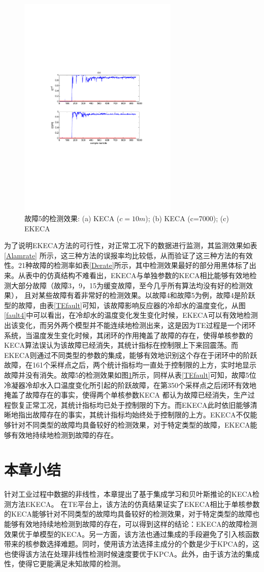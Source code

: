 \begin{figure}[!htb]
  \includegraphics[width=3in]{./Pictures/5-3.pdf}
  \caption{故障5的检测效果: (a) KECA ($c=10m$); (b) KECA (c=7000); (c) EKECA}\label{fault5}
  \vspace*{-0.4cm}
\end{figure}

为了说明EKECA方法的可行性，对正常工况下的数据进行监测，其监测效果如表\ref{Alamrate} 所示，这三种方法的误报率均比较低，从而验证了这三种方法的有效性。21种故障的检测率如表\ref{Derate}所示，其中检测效果最好的部分用黑体标了出来。从表中的仿真结构不难看出，EKECA与单独参数的KECA相比能够有效地检测大部分故障（故障3，9，15为缓变故障，至今几乎所有算法均没有好的检测效果）， 且对某些故障有着非常好的检测效果。以故障4和故障5为例，故障4是阶跃型的故障，由表\ref{TEfault}可知，该故障影响反应器的冷却水的温度变化，从图\ref{fault4}中可以看出，在冷却水的温度变化发生变化时候，EKECA可以有效地检测出该变化，而另外两个模型并不能连续地检测出来，这是因为TE过程是一个闭环系统，当温度发生变化时候，其闭环的作用掩盖了故障的存在，使得单核参数的KECA算法误认为该故障已经消失，其统计指标在控制限上下来回震荡。而EKECA则通过不同类型的参数的集成，能够有效地识别这个存在于闭环中的阶跃故障，在161个采样点之后，两个统计指标均一直处于控制限的上方，实时地显示故障并没有消失。故障5的检测效果如图\ref{fault5}所示，同样从表\ref{TEfault}可知，故障5位冷凝器冷却水入口温度变化所引起的阶跃故障，在第350个采样点之后闭环有效地掩盖了故障存在的事实，使得两个单核参数KECA 都认为故障已经消失，生产过程恢复正常工况，其统计指标均已处于控制限的下方。而EKECA此时依旧能够清晰地指出故障存在的事实，其统计指标均始终处于控制限的上方。EKECA不仅能够针对不同类型的故障均具备较好的检测效果，对于特定类型的故障，EKECA能够有效地持续地检测到故障的存在。
\section{本章小结}
针对工业过程中数据的非线性，本章提出了基于集成学习和贝叶斯推论的KECA检测方法EKECA。 在TE平台上，该方法的仿真结果证实了EKECA相比于单核参数的KECA能够针对不同类型的故障均具备较好的检测效果，对于特定类型的故障也能够有效地持续地检测到故障的存在，可以得到这样的结论：EKECA的故障检测效果优于单模型的KECA。另一方面，该方法也通过集成的手段避免了引入核函数带来的核参数选择难题。同时，使用该方法选择主成分的个数是少于KPCA的，这也使得该方法在处理非线性检测时候速度要优于KPCA。此外，由于该方法的集成性，使得它更能满足未知故障的检测。
